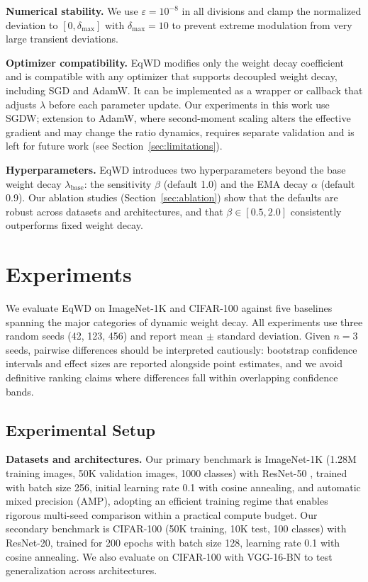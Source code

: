 \documentclass{article}
\begin{document}
\textbf{Numerical stability.} We use $\varepsilon = 10^{-8}$ in all
divisions and clamp the normalized deviation to
$[0, \delta_{\text{max}}]$ with $\delta_{\text{max}} = 10$ to
prevent extreme modulation from very large transient deviations.

\textbf{Optimizer compatibility.} EqWD modifies only the weight decay
coefficient and is compatible with any optimizer that supports decoupled
weight decay, including SGD and AdamW. It can be implemented as a
wrapper or callback that adjusts $\lambda$ before each parameter
update. Our experiments in this work use SGDW; extension to AdamW, where
second-moment scaling alters the effective gradient and may change the
ratio dynamics, requires separate validation and is left for future work
(see Section~\ref{sec:limitations}).

\textbf{Hyperparameters.} EqWD introduces two hyperparameters beyond the
base weight decay $\lambda_{\text{base}}$: the sensitivity $\beta$
(default 1.0) and the EMA decay $\alpha$ (default 0.9). Our ablation
studies (Section~\ref{sec:ablation}) show that the defaults are robust across datasets
and architectures, and that $\beta \in [0.5, 2.0]$ consistently
outperforms fixed weight decay.


\section{Experiments}
\label{sec:experiments}

We evaluate EqWD on ImageNet-1K \citep{deng2009imagenet} and CIFAR-100
\citep{krizhevsky2009cifar} against five baselines spanning the major
categories of dynamic weight decay. All experiments use three random
seeds (42, 123, 456) and report mean $\pm$ standard deviation. Given
$n=3$ seeds, pairwise differences should be interpreted cautiously:
bootstrap confidence intervals and effect sizes are reported alongside
point estimates, and we avoid definitive ranking claims where
differences fall within overlapping confidence bands.

\subsection{Experimental Setup}
\label{sec:setup}

\textbf{Datasets and architectures.} Our primary benchmark is
ImageNet-1K (1.28M training images, 50K validation images, 1000 classes)
with ResNet-50 \citep{he2016resnet}, trained with batch
size 256, initial learning rate 0.1 with cosine annealing, and automatic
mixed precision (AMP), adopting an efficient training regime that
enables rigorous multi-seed comparison within a practical compute budget. Our
secondary benchmark is CIFAR-100 (50K training, 10K test, 100 classes)
with ResNet-20, trained for 200 epochs with batch size 128, learning
rate 0.1 with cosine annealing. We also evaluate on CIFAR-100 with
VGG-16-BN \citep{simonyan2015vgg} to test generalization across
architectures.
\end{document}
